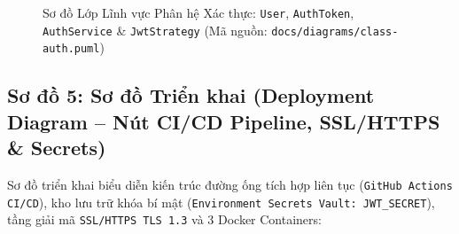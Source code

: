 \documentclass[a4paper]{article}
\begin{document}
\begin{figure}[H]
{
}
\caption{Sơ đồ Lớp Lĩnh vực Phân hệ Xác thực: \texttt{User}, \texttt{AuthToken}, \texttt{AuthService} \& \texttt{JwtStrategy} (Mã nguồn: \nolinkurl{docs/diagrams/class-auth.puml})}
\label{fig:class_auth}
\end{figure}

\subsection{Sơ đồ 5: Sơ đồ Triển khai (Deployment Diagram – Nút CI/CD Pipeline, SSL/HTTPS \& Secrets)}
Sơ đồ triển khai biểu diễn kiến trúc đường ống tích hợp liên tục (\texttt{GitHub Actions CI/CD}), kho lưu trữ khóa bí mật (\texttt{Environment Secrets Vault: JWT\_SECRET}), tầng giải mã \texttt{SSL/HTTPS TLS 1.3} và 3 Docker Containers:
\end{document}
